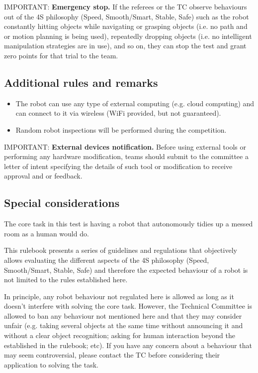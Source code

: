 \documentclass{article}
\begin{document}
IMPORTANT: \textbf{Emergency stop.} If the referees or the TC observe behaviours out of the 4S philosophy (Speed, Smooth/Smart, Stable, Safe) such as the robot constantly hitting objects while navigating or grasping objects (i.e. no path and or motion planning is being used), repeatedly dropping objects (i.e. no intelligent manipulation strategies are in use), and so on, they can stop the test and grant zero points for that trial to the team.

\clearpage
\subsection{Additional rules and remarks}

\begin{itemize}
    \item The robot can use any type of external computing (e.g. cloud computing) and can connect to it via wireless (WiFi provided, but not guaranteed).
    \item Random robot inspections will be performed during the competition.
\end{itemize}

IMPORTANT: \textbf{External devices notification.} Before using external tools or performing any hardware modification, teams should submit to the committee a letter of intent specifying the details of such tool or modification to receive approval and or feedback.

\subsection{Special considerations}

The core task in this test is having a robot that autonomously tidies up a messed room as a human would do. 

This rulebook presents a series of guidelines and regulations that objectively allows evaluating the different aspects of the 4S philosophy (Speed, Smooth/Smart, Stable, Safe) and therefore the expected behaviour of a robot is not limited to the rules established here. 

In principle, any robot behaviour not regulated here is allowed as long as it doesn't interfere with solving the core task. However, the Technical Committee is allowed to ban any behaviour not mentioned here and that they may consider unfair (e.g. taking several objects at the same time without announcing it and without a clear object recognition; asking for human interaction beyond the established in the rulebook; etc). If you have any concern about a behaviour that may seem controversial, please contact the TC before considering their application to solving the task.
\end{document}
